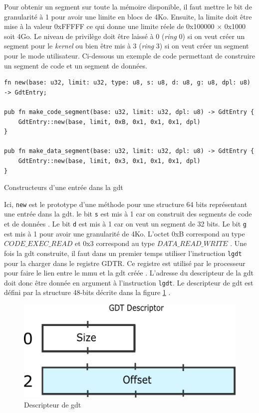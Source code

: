 Pour obtenir un  segment sur toute la mémoire disponible, il faut mettre le bit
de granularité à 1 pour avoir une limite en blocs de 4Ko. Ensuite, la limite doit
être mise à la valeur 0xFFFFF ce qui donne une limite réele de 0x100000 $\times$
0x1000 soit 4Go. Le niveau de privilège doit être laissé à 0 (\textit{ring} 0)
si on veut créer un segment pour le \textit{kernel} ou bien être mis à 3 (\textit{ring}
3) si on veut créer un segment pour le mode utilisateur. Ci-dessous un exemple de
code permettant de construire un segment de code et un segment de données. \newpage

\begin{code}
\begin{verbatim}
fn new(base: u32, limit: u32, type: u8, s: u8, d: u8, g: u8, dpl: u8) -> GdtEntry;

pub fn make_code_segment(base: u32, limit: u32, dpl: u8) -> GdtEntry {
    GdtEntry::new(base, limit, 0xB, 0x1, 0x1, 0x1, dpl)
}

pub fn make_data_segment(base: u32, limit: u32, dpl: u8) -> GdtEntry {
    GdtEntry::new(base, limit, 0x3, 0x1, 0x1, 0x1, dpl)
}
\end{verbatim}
\caption{Constructeurs d'une entrée dans la \acrshort{gdt}}
\label{lst:mem:gdt:constructors}
\end{code} \bigbreak

Ici, \texttt{new} est le prototype d'une méthode pour une structure 64
bits représentant une entrée dans la \acrshort{gdt}. le bit \texttt{s}
est mis à 1 car on construit des segments de code et de données \cite{ref66}.
Le bit \texttt{d} est mis à 1 car on veut un segment de 32 bits. Le bit
\texttt{g} est mis à 1 pour avoir une granularité de 4Ko. L'octet 0xB
correspond au type $CODE\_EXEC\_READ$ et 0x3 correspond au type $DATA\_READ\_WRITE$
\cite{ref42}. Une fois la \acrshort{gdt} construite, il faut dans un premier temps
utiliser l'instruction \texttt{lgdt} pour la charger dans le registre
GDTR. Ce registre est utilisé par le processeur pour faire le lien entre le \acrshort{mmu}
et la \acrshort{gdt} créée \cite{ref66}. L'adresse du descripteur de la \acrshort{gdt}
doit donc être donnée en argument à l'instruction \texttt{lgdt}. Le
descripteur de \acrshort{gdt} est défini par la structure 48-bits décrite dans
la figure \ref{gdt_descriptor} \cite{ref14}.

\begin{figure}[!h]
  \centering
  \includegraphics[scale=0.5]{images/gdt_descriptor.png}
  \caption{Descripteur de \acrshort{gdt}}
  \label{gdt_descriptor}
\end{figure}

